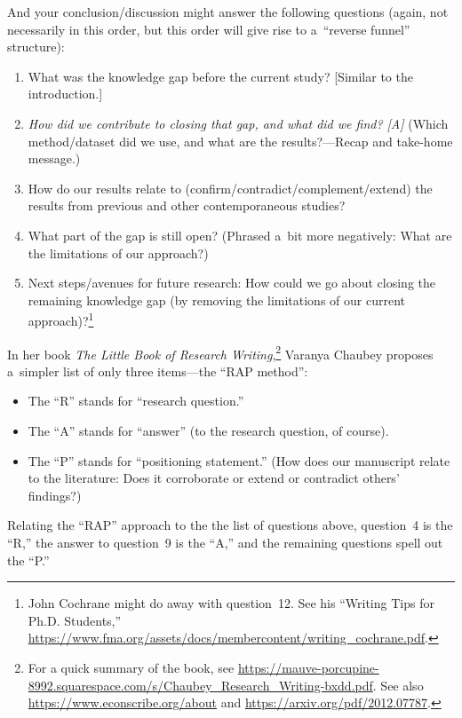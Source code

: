 And your conclusion/discussion might answer the following questions (again, not necessarily in this order, but this order will give rise to a~``reverse funnel'' structure):
\begin{enumerate}[resume, labelindent = \parindent, leftmargin = 2\parindent]
	\item What was the knowledge gap before the current study? [Similar to the introduction.]
	\item \emph{How did we contribute to closing that gap, and what did we find? [A]} (Which method\slash dataset did we use, and what are the results?---Recap and take-home message.)
	\item How do our results relate to (confirm\slash contradict\slash complement\slash extend) the results from previous and other contemporaneous studies?
	\item What part of the gap is still open? (Phrased a~bit more negatively: What are the limitations of our approach?)
	\item Next steps\slash avenues for future research: How could we go about closing the remaining knowledge gap (by removing the limitations of our current approach)?\footnote{John Cochrane might do away with question~12. See his ``Writing Tips for Ph.D. Students,'' \url{https://www.fma.org/assets/docs/membercontent/writing_cochrane.pdf}.}
\end{enumerate}

In her book \textit{The Little Book of Research Writing},\footnote{For a quick summary of the book, see \url{https://mauve-porcupine-8992.squarespace.com/s/Chaubey_Research_Writing-bxdd.pdf}. See also \url{https://www.econscribe.org/about} and \url{https://arxiv.org/pdf/2012.07787}.} Varanya Chaubey proposes a~simpler list of only three items---the ``RAP method'':
\begin{itemize}
	\item The ``R'' stands for ``research question.''
	\item The ``A'' stands for ``answer'' (to the research question, of course).
	\item The ``P'' stands for ``positioning statement.'' (How does our manuscript relate to the literature: Does it corroborate or extend or contradict others' findings?)
\end{itemize}

Relating the ``RAP'' approach to the the list of questions above, question~4 is the ``R,'' the answer to question~9 is the ``A,'' and the remaining questions spell out the ``P.''

